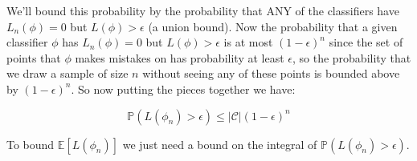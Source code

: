 \documentclass[12pt]{article}
\begin{document}
We'll bound this probability by the probability that ANY of the
classifiers have $L_n(\phi) = 0$ but $L(\phi) > \epsilon$ (a union
bound). Now the probability that a given classifier $\phi$ has
$L_n(\phi) = 0$ but $L(\phi) > \epsilon$ is at most $(1-\epsilon)^n$
since the set of points that $\phi$ makes mistakes on has probability
at least $\epsilon$, so the probability that we draw a sample of size
$n$ without seeing any of these points is bounded above by
$(1-\epsilon)^n$. So now putting the pieces together we have:

$$\mathbb{P}(L(\phi_n) > \epsilon) \leq |\mathcal{C}|(1-\epsilon)^n$$

To bound $\mathbb{E}[L(\phi_n)]$ we just need a bound on the integral
of $\mathbb{P}(L(\phi_n) > \epsilon)$.



\end{document}
